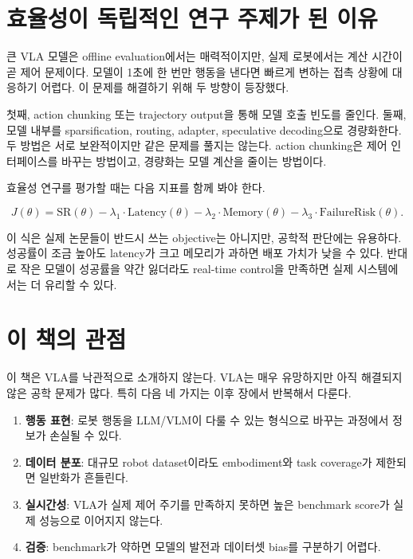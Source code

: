 \section{효율성이 독립적인 연구 주제가 된 이유}

큰 VLA 모델은 offline evaluation에서는 매력적이지만, 실제 로봇에서는 계산 시간이 곧 제어 문제이다. 모델이 1초에 한 번만 행동을 낸다면 빠르게 변하는 접촉 상황에 대응하기 어렵다. 이 문제를 해결하기 위해 두 방향이 등장했다.

첫째, action chunking 또는 trajectory output을 통해 모델 호출 빈도를 줄인다. 둘째, 모델 내부를 sparsification, routing, adapter, speculative decoding으로 경량화한다. 두 방법은 서로 보완적이지만 같은 문제를 풀지는 않는다. action chunking은 제어 인터페이스를 바꾸는 방법이고, 경량화는 모델 계산을 줄이는 방법이다.

효율성 연구를 평가할 때는 다음 지표를 함께 봐야 한다.

\begin{equation}
  J(\theta)
  =
  \mathrm{SR}(\theta)
  -
  \lambda_1 \cdot \mathrm{Latency}(\theta)
  -
  \lambda_2 \cdot \mathrm{Memory}(\theta)
  -
  \lambda_3 \cdot \mathrm{FailureRisk}(\theta).
  \label{eq:utility}
\end{equation}

이 식은 실제 논문들이 반드시 쓰는 objective는 아니지만, 공학적 판단에는 유용하다. 성공률이 조금 높아도 latency가 크고 메모리가 과하면 배포 가치가 낮을 수 있다. 반대로 작은 모델이 성공률을 약간 잃더라도 real-time control을 만족하면 실제 시스템에서는 더 유리할 수 있다.

\section{이 책의 관점}

이 책은 VLA를 낙관적으로 소개하지 않는다. VLA는 매우 유망하지만 아직 해결되지 않은 공학 문제가 많다. 특히 다음 네 가지는 이후 장에서 반복해서 다룬다.

\begin{enumerate}
  \item \textbf{행동 표현}: 로봇 행동을 LLM/VLM이 다룰 수 있는 형식으로 바꾸는 과정에서 정보가 손실될 수 있다.
  \item \textbf{데이터 분포}: 대규모 robot dataset이라도 embodiment와 task coverage가 제한되면 일반화가 흔들린다.
  \item \textbf{실시간성}: VLA가 실제 제어 주기를 만족하지 못하면 높은 benchmark score가 실제 성능으로 이어지지 않는다.
  \item \textbf{검증}: benchmark가 약하면 모델의 발전과 데이터셋 bias를 구분하기 어렵다.
\end{enumerate}

